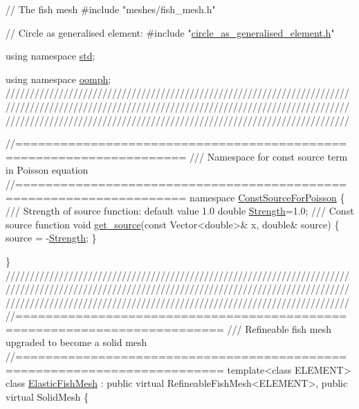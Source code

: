 \begin{DoxyCodeInclude}
\textcolor{comment}{// The fish mesh }
\textcolor{preprocessor}{#include "meshes/fish\_mesh.h"} 

\textcolor{comment}{// Circle as generalised element:}
\textcolor{preprocessor}{#include "\hyperlink{circle__as__generalised__element_8h}{circle\_as\_generalised\_element.h}"}

\textcolor{keyword}{using namespace }\hyperlink{namespacestd}{std};

\textcolor{keyword}{using namespace }\hyperlink{namespaceoomph}{oomph};
\textcolor{comment}{}
\textcolor{comment}{///////////////////////////////////////////////////////////////////////}
\textcolor{comment}{///////////////////////////////////////////////////////////////////////}
\textcolor{comment}{///////////////////////////////////////////////////////////////////////}
\textcolor{comment}{}


\textcolor{comment}{//====================================================================}\textcolor{comment}{}
\textcolor{comment}{/// Namespace for const source term in Poisson equation}
\textcolor{comment}{}\textcolor{comment}{//====================================================================}
\textcolor{keyword}{namespace }\hyperlink{namespaceConstSourceForPoisson}{ConstSourceForPoisson}
\{\textcolor{comment}{}
\textcolor{comment}{ /// Strength of source function: default value 1.0}
\textcolor{comment}{} \textcolor{keywordtype}{double} \hyperlink{namespaceConstSourceForPoisson_add351c5acab2561d68d1fc9ec3d5fc5e}{Strength}=1.0;
\textcolor{comment}{}
\textcolor{comment}{/// Const source function}
\textcolor{comment}{} \textcolor{keywordtype}{void} \hyperlink{namespaceConstSourceForPoisson_a40ef79083874b58ed42b4df2ca0f4c10}{get\_source}(\textcolor{keyword}{const} Vector<double>& x, \textcolor{keywordtype}{double}& source)
 \{
  source = -\hyperlink{namespaceConstSourceForPoisson_add351c5acab2561d68d1fc9ec3d5fc5e}{Strength};
 \}
 
\}
\textcolor{comment}{}
\textcolor{comment}{///////////////////////////////////////////////////////////////////////}
\textcolor{comment}{///////////////////////////////////////////////////////////////////////}
\textcolor{comment}{///////////////////////////////////////////////////////////////////////}
\textcolor{comment}{}
\textcolor{comment}{//=========================================================================}\textcolor{comment}{}
\textcolor{comment}{/// Refineable fish mesh upgraded to become a solid mesh}
\textcolor{comment}{}\textcolor{comment}{//=========================================================================}
\textcolor{keyword}{template}<\textcolor{keyword}{class} ELEMENT>
\textcolor{keyword}{class }\hyperlink{classElasticFishMesh}{ElasticFishMesh} : \textcolor{keyword}{public} \textcolor{keyword}{virtual} RefineableFishMesh<ELEMENT>, 
                        \textcolor{keyword}{public} \textcolor{keyword}{virtual} SolidMesh 
\{


\end{DoxyCodeInclude}
